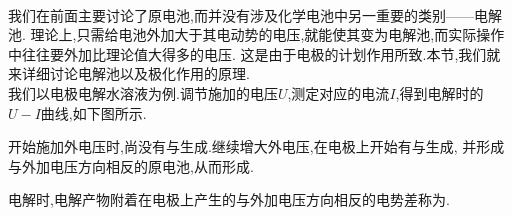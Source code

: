 \documentclass{ctexart}
\begin{document}
\pagestyle{plain}
\noindent{}\vspace{15pt}\\
\indent 我们在前面主要讨论了原电池,而并没有涉及化学电池中另一重要的类别——电解池.%
理论上,只需给电池外加大于其电动势的电压,就能使其变为电解池,而实际操作中往往要外加比理论值大得多的电压.%
这是由于电极的计划作用所致.本节,我们就来详细讨论电解池以及极化作用的原理.\vspace{12pt}\\
\indent 我们以电极电解水溶液为例.调节施加的电压$U$,测定对应的电流$I$,得到电解时的$U-I$曲线,如下图所示.
\begin{figure}[H]
    \centering
\end{figure}
开始施加外电压时,尚没有与生成.继续增大外电压,在电极上开始有与生成,%
并形成与外加电压方向相反的原电池,从而形成.
\begin{definition}[6E.1.1 反电动势]
    电解时,电解产物附着在电极上产生的与外加电压方向相反的电势差称为.
\end{definition}
\end{document}
